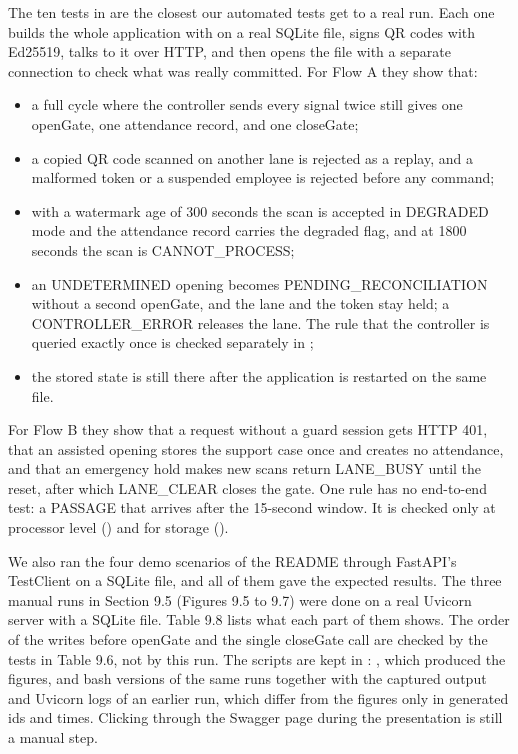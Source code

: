 \vspace{10pt}

The ten tests in  are the closest our automated tests get to a real run. Each one builds the whole application with  on a real SQLite file, signs QR codes with Ed25519, talks to it over HTTP, and then opens the file with a separate connection to check what was really committed. For Flow A they show that:

\begin{itemize}[leftmargin=36pt, itemsep=2pt, topsep=4pt, parsep=2pt]
  \item a full cycle where the controller sends every signal twice still gives one openGate, one attendance record, and one closeGate;
  \item a copied QR code scanned on another lane is rejected as a replay, and a malformed token or a suspended employee is rejected before any command;
  \item with a watermark age of 300 seconds the scan is accepted in DEGRADED mode and the attendance record carries the degraded flag, and at 1800 seconds the scan is CANNOT\_PROCESS;
  \item an UNDETERMINED opening becomes PENDING\_RECONCILIATION without a second openGate, and the lane and the token stay held; a CONTROLLER\_ERROR releases the lane. The rule that the controller is queried exactly once is checked separately in ;
  \item the stored state is still there after the application is restarted on the same file.
\end{itemize}

For Flow B they show that a request without a guard session gets HTTP 401, that an assisted opening stores the support case once and creates no attendance, and that an emergency hold makes new scans return LANE\_BUSY until the reset, after which LANE\_CLEAR closes the gate. One rule has no end-to-end test: a PASSAGE that arrives after the 15-second window. It is checked only at processor level () and for storage ().


We also ran the four demo scenarios of the README through FastAPI's TestClient on a SQLite file, and all of them gave the expected results. The three manual runs in Section 9.5 (Figures 9.5 to 9.7) were done on a real Uvicorn server with a SQLite file. Table 9.8 lists what each part of them shows. The order of the writes before openGate and the single closeGate call are checked by the tests in Table 9.6, not by this run. The scripts are kept in : , which produced the figures, and bash versions of the same runs together with the captured output and Uvicorn logs of an earlier run, which differ from the figures only in generated ids and times. Clicking through the Swagger page during the presentation is still a manual step.

